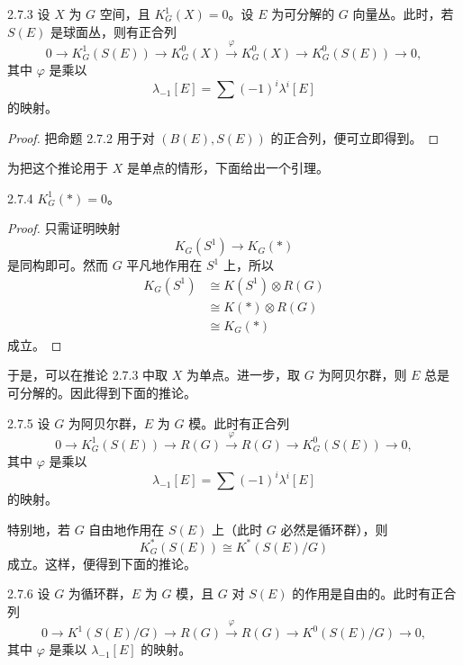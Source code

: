 \begin{corollary*}{2.7.3}
  设 $X$ 为 $G$ 空间，且 $K_G^1(X)=0$。设 $E$ 为可分解的 $G$ 向量丛。此时，若 $S(E)$ 是球面丛，则有正合列
  \[
  0\longrightarrow K_G^1(S(E))\longrightarrow K_G^0(X)\xrightarrow{\ \varphi\ }K_G^0(X)
  \longrightarrow K_G^0(S(E))\longrightarrow0,
  \]
  其中 $\varphi$ 是乘以
  \[
  \lambda_{-1}[E]=\sum(-1)^i\lambda^i[E]
  \]
  的映射。
\end{corollary*}

\begin{proof}
  把命题 2.7.2 用于对 $(B(E),S(E))$ 的正合列，便可立即得到。
\end{proof}


为把这个推论用于 $X$ 是单点的情形，下面给出一个引理。

\begin{lemma*}{2.7.4}
  $K_G^1(*)=0$。
\end{lemma*}

\begin{proof}
  只需证明映射
  \[
  K_G(S^1)\longrightarrow K_G(*)
  \]
  是同构即可。然而 $G$ 平凡地作用在 $S^1$ 上，所以
  \[
  \begin{aligned}
  K_G(S^1)&\cong K(S^1)\otimes R(G)\\
  &\cong K(*)\otimes R(G)\\
  &\cong K_G(*)
  \end{aligned}
  \]
  成立。
\end{proof}

于是，可以在推论 2.7.3 中取 $X$ 为单点。进一步，取 $G$ 为阿贝尔群，则 $E$ 总是可分解的。因此得到下面的推论。

\begin{corollary*}{2.7.5}
  设 $G$ 为阿贝尔群，$E$ 为 $G$ 模。此时有正合列
  \[
  0\longrightarrow K_G^1(S(E))\longrightarrow R(G)\xrightarrow{\ \varphi\ }R(G)
  \longrightarrow K_G^0(S(E))\longrightarrow0,
  \]
  其中 $\varphi$ 是乘以
  \[
  \lambda_{-1}[E]=\sum(-1)^i\lambda^i[E]
  \]
  的映射。
\end{corollary*}

特别地，若 $G$ 自由地作用在 $S(E)$ 上（此时 $G$ 必然是循环群），则
\[
K_G^*(S(E))\cong K^*(S(E)/G)
\]
成立。这样，便得到下面的推论。

\begin{corollary*}{2.7.6}
  设 $G$ 为循环群，$E$ 为 $G$ 模，且 $G$ 对 $S(E)$ 的作用是自由的。此时有正合列
  \[
  0\longrightarrow K^1(S(E)/G)\longrightarrow R(G)\xrightarrow{\ \varphi\ }R(G)
  \longrightarrow K^0(S(E)/G)\longrightarrow0,
  \]
  其中 $\varphi$ 是乘以 $\lambda_{-1}[E]$ 的映射。
\end{corollary*}

